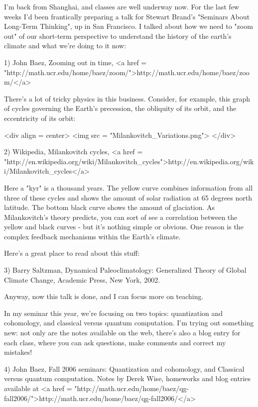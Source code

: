 


I'm back from Shanghai, and classes are well underway now.  For the
last few weeks I'd been frantically preparing a talk for Stewart
Brand's "Seminars About Long-Term Thinking", up in San
Francisco.  I talked about how we need to "zoom out" of our
short-term perspective to understand the history of the earth's
climate and what we're doing to it now:

1) John Baez, Zooming out in time, 
<a href = "http://math.ucr.edu/home/baez/zoom/">http://math.ucr.edu/home/baez/zoom/</a>

There's a lot of tricky physics in this business.  Consider, 
for example, this graph of cycles governing the Earth's precession, 
the obliquity of its orbit, and the eccentricity of its orbit:

<div align = center>
<img src = "Milankovitch_Variations.png">
</div>

2) Wikipedia, Milankovitch cycles, 
<a href = "http://en.wikipedia.org/wiki/Milankovitch_cycles">http://en.wikipedia.org/wiki/Milankovitch_cycles</a>

Here a "kyr" is a thousand years.  
The yellow curve combines information from all three of these cycles
and shows the amount of solar radiation at 65 degrees north latitude.
The bottom black curve shows the amount of glaciation.  As
Milankovitch's theory predicts, you can sort of see a correlation
between the yellow and black curves - but it's nothing simple or
obvious.  One reason is the complex feedback mechanisms within the
Earth's climate.

Here's a great place to read about this stuff:

3) Barry Saltzman, Dynamical Paleoclimatology: Generalized Theory of 
Global Climate Change, Academic Press, New York, 2002.

Anyway, now this talk is done, and I can focus more on teaching.

In my seminar this year, we're focusing on two topics: quantization
and cohomology, and classical versus quantum computation.  I'm
trying out something new: not only are the notes available on the 
web, there's also a blog entry for each class, where you can ask 
questions, make comments and correct my mistakes!

4) John Baez, Fall 2006 seminars: Quantization and cohomology, and
Classical versus quantum computation.  Notes by Derek Wise, homeworks
and blog entries available at
<a href = "http://math.ucr.edu/home/baez/qg-fall2006/">http://math.ucr.edu/home/baez/qg-fall2006/</a>

